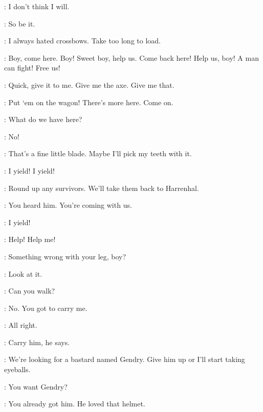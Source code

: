 \YOREN: I don't think I will. 

\AMORY: So be it. 


\YOREN: I always hated crossbows. Take too long to load. 


\JAQEN: Boy, come here. Boy! Sweet boy, help us. Come back here! Help us, boy! A man can fight! Free us! 


\JAQEN: Quick, give it to me. Give me the axe. Give me that. 




\POLLIVER: Put `em on the wagon! There's more here. Come on. 


\POLLIVER: What do we have here? 

\ARYA: No! 


\POLLIVER: That's a fine little blade. Maybe I'll pick my teeth with it. 

\HOTPIE: I yield! I yield! 

\AMORY: Round up any survivors. We'll take them back to Harrenhal. 

\POLLIVER: You heard him. You're coming with us. 

\HOTPIE: I yield! 

\LOMMY: Help! Help me! 

\POLLIVER: Something wrong with your leg, boy? 

\LOMMY: Look at it. 

\POLLIVER: Can you walk? 

\LOMMY: No. You got to carry me. 

\POLLIVER: All right. 


\POLLIVER: Carry him, he says. 


\AMORY: We're looking for a bastard named Gendry. Give him up or I'll start taking eyeballs. 

\ARYA: You want Gendry?


\ARYA: You already got him. He loved that helmet. 


